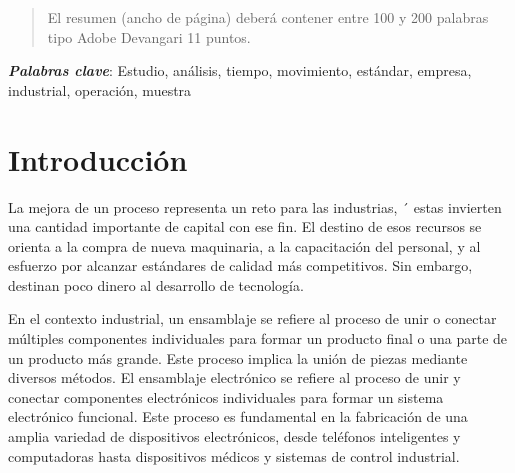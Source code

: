     \maketitle
    \thispagestyle{fancy}
    
    
    
    \begin{abstract}
    \noindent 
    El resumen (ancho de página) deberá contener entre 100 y 200 palabras tipo Adobe Devangari 11 puntos.
    
    \end{abstract}
    \textbf{\textit{Palabras clave}}: {Estudio, análisis, tiempo, movimiento, estándar, empresa, industrial, operación, muestra}
    
    \section{Introducción}
    
    La mejora de un proceso representa un reto para las industrias, ´ estas invierten una cantidad importante de capital con ese fin. El destino de esos recursos se orienta a la compra de nueva maquinaria, a la capacitación del personal, y al esfuerzo por alcanzar estándares de calidad más competitivos. Sin embargo, destinan poco dinero al desarrollo de tecnología.\cite{83520408}
    
    En el contexto industrial, un ensamblaje se refiere al proceso de unir o conectar múltiples componentes individuales para formar un producto final o una parte de un producto más grande. Este proceso implica la unión de piezas mediante diversos métodos. El ensamblaje electrónico se refiere al proceso de unir y conectar componentes electrónicos individuales para formar un sistema electrónico funcional. Este proceso es fundamental en la fabricación de una amplia variedad de dispositivos electrónicos, desde teléfonos inteligentes y computadoras hasta dispositivos médicos y sistemas de control industrial.
    
